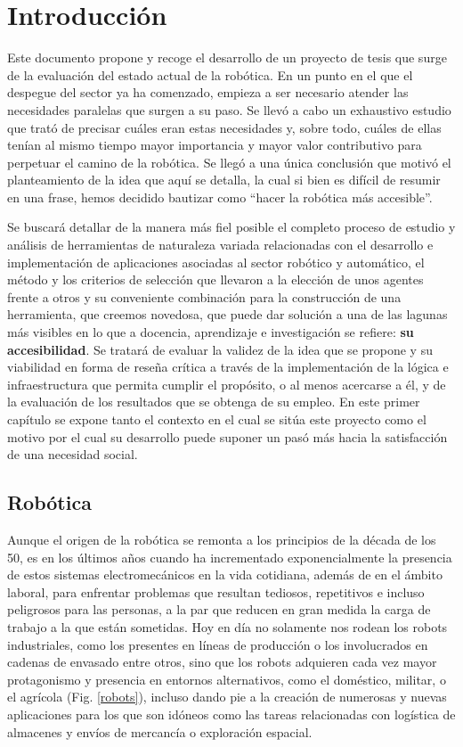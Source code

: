 \chapter{Introducción}

Este documento propone y recoge el desarrollo de un proyecto de tesis que surge de la evaluación del estado actual de la robótica. En un punto en el que el despegue del sector ya ha comenzado, empieza a ser necesario atender las necesidades paralelas que surgen a su paso. Se llevó a cabo un exhaustivo estudio que trató de precisar cuáles eran estas necesidades y, sobre todo, cuáles de  ellas tenían al mismo tiempo mayor importancia y mayor valor contributivo para perpetuar el camino de la robótica. Se llegó a una única conclusión que motivó el planteamiento de la idea que aquí se detalla, la cual si bien es difícil de resumir en una frase, hemos decidido bautizar como ``hacer la robótica más accesible''.

Se buscará detallar de la manera más fiel posible el completo proceso de estudio y análisis de herramientas de naturaleza variada relacionadas con el desarrollo e implementación de aplicaciones asociadas al sector robótico y automático, el método y los criterios de selección que llevaron a la elección de unos agentes frente a otros y su conveniente combinación para la construcción de una herramienta, que creemos novedosa, que puede dar solución a una de las lagunas más visibles en lo que a docencia, aprendizaje e investigación se refiere: {\bf{su accesibilidad}}. Se tratará de evaluar la validez de la idea que se propone y su viabilidad en forma de reseña crítica a través de la implementación de la lógica e infraestructura que permita cumplir el propósito, o al menos acercarse a él, y de la evaluación de los resultados que se obtenga de su empleo. En este primer capítulo se expone tanto el contexto en el cual se sitúa este proyecto como el motivo por el cual su desarrollo puede suponer un pasó más hacia la satisfacción de una necesidad social.

\section{Robótica}

Aunque el origen de la robótica se remonta a los principios de la década de los 50, es en los últimos años cuando ha incrementado exponencialmente la presencia de estos sistemas electromecánicos en la vida cotidiana, además de en el ámbito laboral, para enfrentar problemas que resultan tediosos, repetitivos e incluso peligrosos para las personas, a la par que reducen en gran medida la carga de trabajo a la que están sometidas. Hoy en día no solamente nos rodean los robots industriales, como los presentes en líneas de producción o los involucrados en cadenas de envasado entre otros, sino que los robots adquieren cada vez mayor protagonismo y presencia en entornos alternativos, como el doméstico, militar, o el agrícola (Fig. \ref{robots}), incluso dando pie a la creación de numerosas y nuevas aplicaciones para los que son idóneos como las tareas relacionadas con logística de almacenes y envíos de mercancía o exploración espacial.

